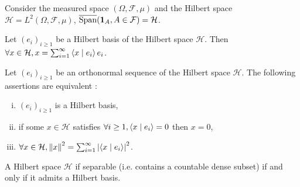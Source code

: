 \begin{pop}
	Consider the measured space $(\Omega, \mathcal{F}, \mu)$ and the Hilbert space $\mathcal{H} = L^2(\Omega, \mathcal{F}, \mu)$, $\overline{\operatorname{Span}}(\operatorname{\mathbf{1}}_A, A \in \mathcal{F}) = \mathcal{H}$.
\end{pop}

\begin{thm}
	Let $(e_i)_{i \geq 1}$ be a Hilbert basis of the Hilbert space $\mathcal{H}$.
	Then $\forall x \in \mathcal{H}, x = \sum_{i = 1}^\infty \left\langle x \mid e_i \right\rangle e_i$.
\end{thm}

\begin{thm}
	Let $(e_i)_{i \geq 1}$ be an orthonormal sequence of the Hilbert space $\mathcal{H}$.
	The following assertions are equivalent :
	\begin{enumerate}[(i)]
		\item $(e_i)_{i \geq 1}$ is a Hilbert basis,
		\item if some $x \in \mathcal{H}$ satisfies $\forall i \geq 1, \left\langle x \mid e_i \right\rangle = 0$ then $x = 0$,
		\item $\forall x \in \mathcal{H}, \left\lVert x\right\rVert^2 = \sum_{i = 1}^\infty \left\lvert\left\langle x \mid e_i \right\rangle\right\rvert^2$.
	\end{enumerate}
\end{thm}

\begin{thm}
	A Hilbert space $\mathcal{H}$ if separable (i.e. contains a countable dense subset) if and only if it admits a Hilbert basis.
\end{thm}